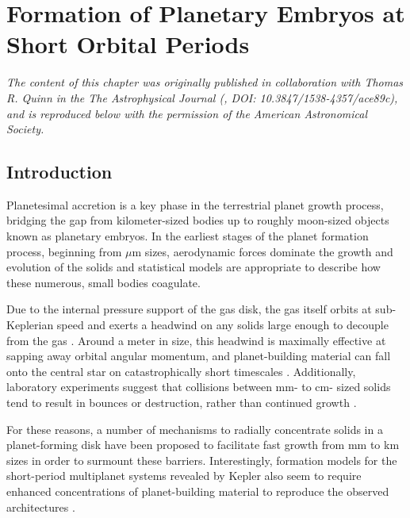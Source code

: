 \chapter {Formation of Planetary Embryos at Short Orbital Periods}\label{ch:stipPl}

\noindent \textit{The content of this chapter was originally published in collaboration with Thomas R. Quinn in the The Astrophysical Journal (\cite{wallace23}, DOI: 10.3847/1538-4357/ace89c), and is reproduced below with the permission of the American Astronomical Society.}

\section{Introduction} \label{sec:intro}

Planetesimal accretion is a key phase in the terrestrial planet growth
process, bridging the gap from kilometer-sized bodies up to roughly
moon-sized objects known as planetary embryos. In the earliest stages
of the planet formation process, beginning from $\mu$m sizes, aerodynamic forces dominate the
growth and evolution of the solids and statistical models
\cite{johansen14, birnstiel16} are appropriate to describe how these
numerous, small bodies coagulate. 

Due to the internal pressure support
of the gas disk, the gas itself orbits at sub-Keplerian speed and
exerts a headwind on any solids large enough to decouple from the gas
\cite{weidenschilling77}. Around a meter in size, this headwind
is maximally effective at sapping away orbital angular momentum, and planet-building material can fall onto the central star on 
catastrophically short timescales \cite{weidenschilling77, nakagawa86}. Additionally, laboratory experiments suggest that 
collisions between mm- to cm- sized solids tend to result in bounces or destruction, rather than continued growth
\cite{blum93, colwell03, beitz11}.

For these reasons, a number of mechanisms to radially concentrate solids in a planet-forming disk have been proposed to 
facilitate fast growth from mm to km sizes \cite{johansen07, lyra08, bai10} in order to surmount these barriers. Interestingly, 
formation models for the short-period multiplanet systems revealed by Kepler \cite{fabrycky14} also seem to require enhanced 
concentrations of planet-building material to reproduce the observed architectures \cite{raymond07, hansen12}.

